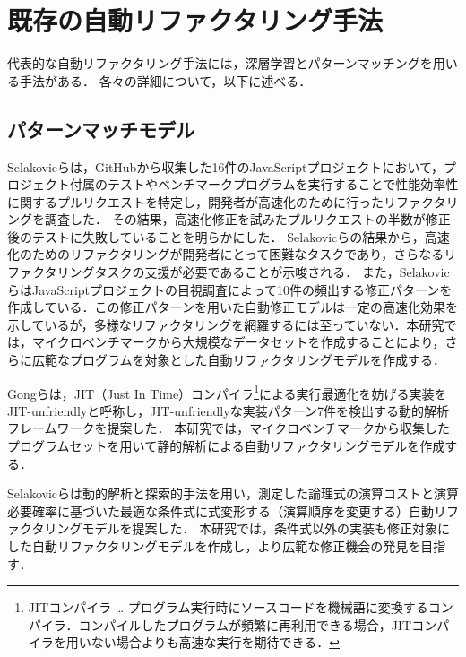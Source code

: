 \documentclass[11pt]{jreport}
\newcommand{\fix}[1]{#1}
\begin{document}


\section{既存の自動リファクタリング手法}


代表的な自動リファクタリング手法には，深層学習とパターンマッチングを用いる手法がある．
各々の詳細について，以下に述べる．




\subsection{パターンマッチモデル}


Selakovicら\cite{Selakovic_2016}は，\fix{GitHubから収集した16件の}JavaScriptプロジェクトにおいて\fix{，プロジェクト付属のテストやベンチマークプログラムを実行することで性能効率性に関するプルリクエストを特定し，}開発者が高速化のために行ったリファクタリングを調査した．
その結果，\fix{高速化修正を試みたプルリクエスト}の半数が修正後のテストに失敗していることを明らかにした．
\fix{Selakovicらの結果から，高速化のためのリファクタリングが開発者にとって困難なタスクであり，さらなるリファクタリングタスクの支援が必要であることが示唆される．}
また，SelakovicらはJavaScriptプロジェクトの\fix{目視調査}によって10件の頻出する修正パターンを作成している．この修正パターンを用いた自動修正モデルは一定の高速化効果を示しているが，多様なリファクタリングを網羅するには至っていない．本研究では，マイクロベンチマークから大規模なデータセットを\fix{作成}することにより，さらに広範なプログラムを対象とした自動リファクタリングモデルを作成する．

Gongら\cite{Gong_2015}は，JIT\fix{（Just In Time）}コンパイラ\footnote{\fix{JITコンパイラ … プログラム実行時にソースコードを機械語に変換するコンパイラ．コンパイルしたプログラムが頻繁に再利用できる場合，JITコンパイラを用いない場合よりも高速な実行を期待できる．}}による\fix{実行}最適化を妨げる実装をJIT-unfriendlyと呼称し，JIT-unfriendlyな\fix{実装パターン7件を検出する動的解析フレームワークを提案した．
本研究では，マイクロベンチマークから収集したプログラムセットを用いて静的解析による自動リファクタリングモデルを作成する．}

Selakovicら\cite{Selakovic_2017}は動的解析と探索的手法を用い，\fix{測定した論理式の演算コストと演算必要確率に基づいた最適な条件式に式変形する（演算順序を変更する）}自動リファクタリングモデルを提案した．
本研究では，\fix{条件式以外の実装も修正対象にした自動リファクタリングモデルを作成し，}より広範な修正機会の発見を目指す．
\end{document}
